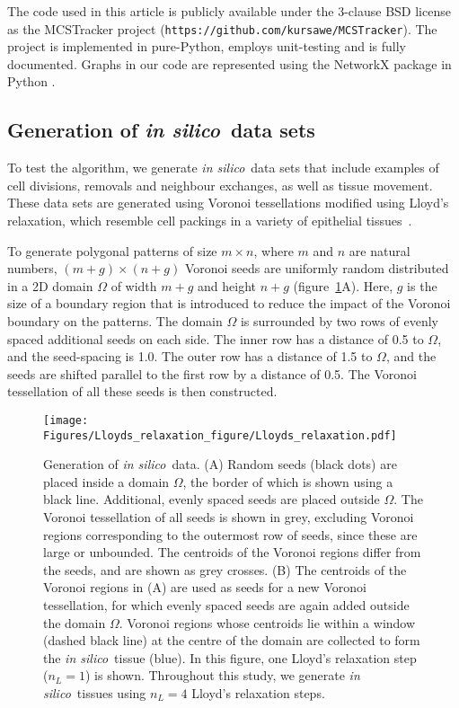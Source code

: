 \documentclass[a4paper,11pt]{article}
\newcommand{\insilico}{\textit{in silico}~}
\begin{document}
The code used in this article is publicly available under the 3-clause BSD license as the \mbox{MCSTracker} project (\texttt{https://github.com/kursawe/MCSTracker}). The project is implemented in pure-Python, employs unit-testing \cite{Osborne2014} and is fully documented. Graphs in our code are represented using the NetworkX package in Python \cite{Hagberg2008}.


\subsection*{Generation of \insilico data sets}

To test the algorithm, we generate \insilico data sets that include examples of cell divisions, removals and neighbour exchanges, as well as tissue movement.  
These data sets are generated using Voronoi tessellations modified using Lloyd's relaxation, which resemble cell packings in a variety of epithelial tissues~\cite{Sanchez-Gutierrez2015, Honda1978}.

To generate polygonal patterns of size $m\times n$, where $m$ and $n$ are natural numbers, $(m+g)\times(n+g)$ Voronoi seeds are uniformly random distributed in a 2D domain $\Omega$ of width $m+g$ and height $n+g$ (figure~\ref{fig:lloyds_relaxation}A). 
Here, $g$ is the size of a boundary region that is introduced to reduce the impact of the Voronoi boundary on the patterns. 
The domain $\Omega$ is surrounded by two rows of evenly spaced additional seeds on each side. The inner row has a distance of 0.5 to $\Omega$, and the seed-spacing is 1.0. 
The outer row has a distance of 1.5 to $\Omega$, and the seeds are shifted parallel to the first row by a distance of 0.5. 
The Voronoi tessellation of all these seeds is then constructed. 


\begin{figure}[t]
\centering
\texttt{[image: Figures/Lloyds\_relaxation\_figure/Lloyds\_relaxation.pdf]}
\caption{Generation of \insilico data. 
(A) Random seeds (black dots) are placed inside a domain $\Omega$, the border of which is shown using a black line. 
Additional, evenly spaced seeds are placed outside $\Omega$. 
The Voronoi tessellation of all seeds is shown in grey, excluding Voronoi regions corresponding to the outermost row of seeds, since these are large or unbounded. 
The centroids of the Voronoi regions differ from the seeds, and are shown as grey crosses. 
(B) The centroids of the Voronoi regions in (A) are used as seeds for a new Voronoi tessellation, for which evenly spaced seeds are again added outside the domain $\Omega$. 
Voronoi regions whose centroids lie within a window (dashed black line) at the centre of the domain are collected to form the \insilico tissue (blue). In this figure, one Lloyd's relaxation step ($n_L=1$) is shown. 
Throughout this study, we generate \insilico tissues using $n_L=4$ Lloyd's relaxation steps.}
\label{fig:lloyds_relaxation}
\end{figure}
\end{document}

